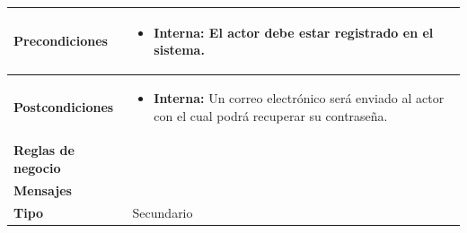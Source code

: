 \begin{center}
\begin{longtable}{| p{3.5cm} | p{11.5cm} |}
        \hline	
          \textbf{Precondiciones}& 
            \begin{itemize}
              \item \textbf{Interna:} El actor debe estar registrado en el sistema.
            \end{itemize} \\
        \hline	
          \textbf{Postcondiciones} & 
            \begin{itemize}
              \item \textbf{Interna:} Un correo electrónico será enviado al actor con el cual podrá recuperar su contraseña.
            \end{itemize} \\
       \hline    
          \textbf{Reglas de negocio} \\
       \hline
          \textbf{Mensajes} & \\
       \hline
          \textbf{Tipo} & Secundario \\
       \hline	    
  \end{longtable}
\end{center}
\endgroup

